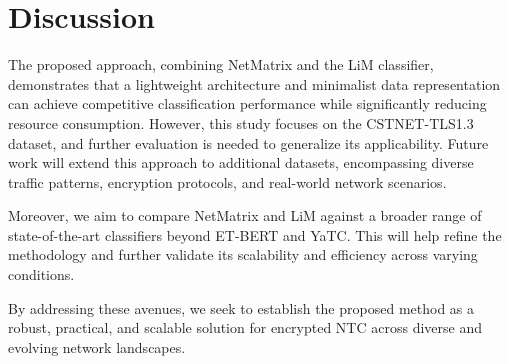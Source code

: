 \section{Discussion}
The proposed approach, combining NetMatrix and the LiM classifier, demonstrates that a lightweight architecture and minimalist data representation can achieve competitive classification performance while significantly reducing resource consumption. However, this study focuses on the CSTNET-TLS1.3 dataset, and further evaluation is needed to generalize its applicability. Future work will extend this approach to additional datasets, encompassing diverse traffic patterns, encryption protocols, and real-world network scenarios.

Moreover, we aim to compare NetMatrix and LiM against a broader range of state-of-the-art classifiers beyond ET-BERT and YaTC. This will help refine the methodology and further validate its scalability and efficiency across varying conditions.

By addressing these avenues, we seek to establish the proposed method as a robust, practical, and scalable solution for encrypted NTC across diverse and evolving network landscapes.